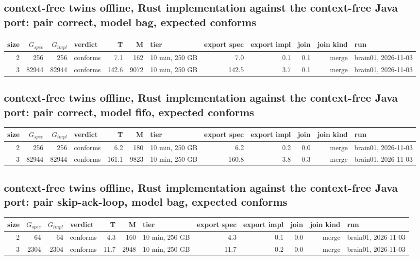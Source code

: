 \documentclass[10pt]{article}
\begin{document}
\subsection*{context-free twins offline, Rust implementation against the context-free Java port: pair \textsf{correct}, model bag, expected conforms}
\begin{longtable}{@{}rrrlrrlrrrrl@{}}
\toprule
size & $G_{\mathit{spec}}$ & $G_{\mathit{impl}}$ & verdict & T & M & tier & export spec & export impl & join & join kind & run \\
\midrule
\endhead
\color{blue} 2 & 256 & 256 & conforms & 7.1 & 162 & 10 min, 250 GB & 7.0 & 0.1 & 0.1 & merge & brain01, 2026-11-03 \\
\color{blue} 3 & 82944 & 82944 & conforms & 142.6 & 9072 & 10 min, 250 GB & 142.5 & 3.7 & 0.1 & merge & brain01, 2026-11-03 \\
\bottomrule
\end{longtable}
\subsection*{context-free twins offline, Rust implementation against the context-free Java port: pair \textsf{correct}, model fifo, expected conforms}
\begin{longtable}{@{}rrrlrrlrrrrl@{}}
\toprule
size & $G_{\mathit{spec}}$ & $G_{\mathit{impl}}$ & verdict & T & M & tier & export spec & export impl & join & join kind & run \\
\midrule
\endhead
\color{blue} 2 & 256 & 256 & conforms & 6.2 & 180 & 10 min, 250 GB & 6.2 & 0.2 & 0.0 & merge & brain01, 2026-11-03 \\
\color{blue} 3 & 82944 & 82944 & conforms & 161.1 & 9823 & 10 min, 250 GB & 160.8 & 3.8 & 0.3 & merge & brain01, 2026-11-03 \\
\bottomrule
\end{longtable}
\subsection*{context-free twins offline, Rust implementation against the context-free Java port: pair \textsf{skip-ack-loop}, model bag, expected conforms}
\begin{longtable}{@{}rrrlrrlrrrrl@{}}
\toprule
size & $G_{\mathit{spec}}$ & $G_{\mathit{impl}}$ & verdict & T & M & tier & export spec & export impl & join & join kind & run \\
\midrule
\endhead
\color{blue} 2 & 64 & 64 & conforms & 4.3 & 160 & 10 min, 250 GB & 4.3 & 0.1 & 0.0 & merge & brain01, 2026-11-03 \\
\color{blue} 3 & 2304 & 2304 & conforms & 11.7 & 2948 & 10 min, 250 GB & 11.7 & 0.2 & 0.0 & merge & brain01, 2026-11-03 \\
\bottomrule
\end{longtable}
\end{document}
